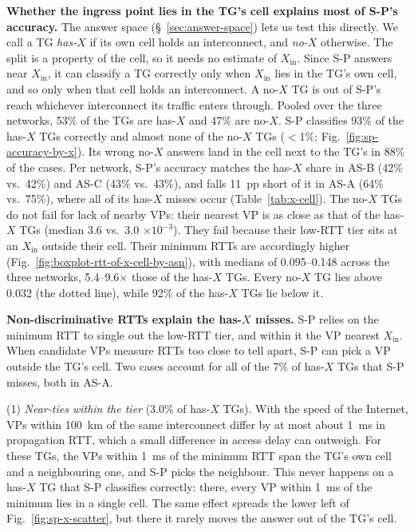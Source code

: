 \noindent \textbf{Whether the ingress point lies in the TG's cell explains most of S-P's accuracy.} The answer space (\S~\ref{sec:answer-space}) lets us test this directly. We call a TG \emph{has-$X$} if its own cell holds an interconnect, and \emph{no-$X$} otherwise. The split is a property of the cell, so it needs no estimate of $X_{\mathrm{in}}$. Since S-P answers near $X_{\mathrm{in}}$, it can classify a TG correctly only when $X_{\mathrm{in}}$ lies in the TG's own cell, and so only when that cell holds an interconnect. A no-$X$ TG is out of S-P's reach whichever interconnect its traffic enters through. Pooled over the three networks, 53\% of the TGs are has-$X$ and 47\% are no-$X$. S-P classifies 93\% of the has-$X$ TGs correctly and almost none of the no-$X$ TGs ($<$1\%; Fig.~\ref{fig:sp-accuracy-by-x}). Its wrong no-$X$ answers land in the cell next to the TG's in 88\% of the cases. Per network, S-P's accuracy matches the has-$X$ share in AS-B (42\% vs.\ 42\%) and AS-C (43\% vs.\ 43\%), and falls 11~pp short of it in AS-A (64\% vs.\ 75\%), where all of its has-$X$ misses occur (Table~\ref{tab:x-cell}). The no-$X$ TGs do not fail for lack of nearby VPs: their nearest VP is as close as that of the has-$X$ TGs (median 3.6 vs.\ 3.0 $\times 10^{-3}$). They fail because their low-RTT tier sits at an $X_{\mathrm{in}}$ outside their cell. Their minimum RTTs are accordingly higher (Fig.~\ref{fig:boxplot-rtt-of-x-cell-by-asn}), with medians of 0.095--0.148 across the three networks, 5.4--9.6$\times$ those of the has-$X$ TGs. Every no-$X$ TG lies above 0.032 (the dotted line), while 92\% of the has-$X$ TGs lie below it. 

\noindent \textbf{Non-discriminative RTTs explain the has-$X$ misses.} S-P relies on the minimum RTT to single out the low-RTT tier, and within it the VP nearest $X_{\mathrm{in}}$. When candidate VPs measure RTTs too close to tell apart, S-P can pick a VP outside the TG's cell. Two cases account for all of the 7\% of has-$X$ TGs that S-P misses, both in AS-A. 

(1) \emph{Near-ties within the tier} (3.0\% of has-$X$ TGs). With the speed of the Internet, VPs within 100~km of the same interconnect differ by at most about 1~ms in propagation RTT, which a small difference in access delay can outweigh. For these TGs, the VPs within 1~ms of the minimum RTT span the TG's own cell and a neighbouring one, and S-P picks the neighbour. This never happens on a has-$X$ TG that S-P classifies correctly: there, every VP within 1~ms of the minimum lies in a single cell. The same effect spreads the lower left of Fig.~\ref{fig:sp-x-scatter}, but there it rarely moves the answer out of the TG's cell. 

